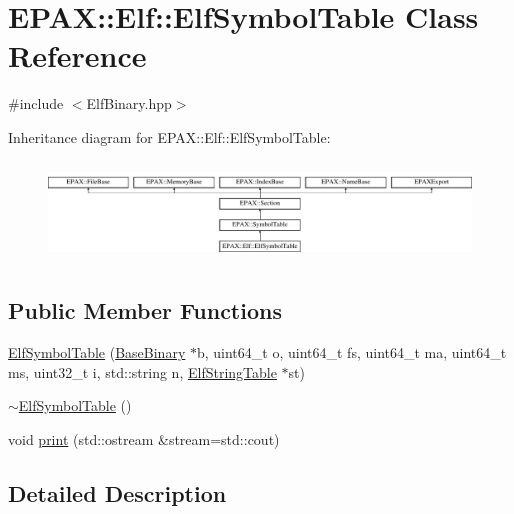\hypertarget{class_e_p_a_x_1_1_elf_1_1_elf_symbol_table}{\section{\-E\-P\-A\-X\-:\-:\-Elf\-:\-:\-Elf\-Symbol\-Table \-Class \-Reference}
\label{class_e_p_a_x_1_1_elf_1_1_elf_symbol_table}
}


{\ttfamily \#include $<$\-Elf\-Binary.\-hpp$>$}

\-Inheritance diagram for \-E\-P\-A\-X\-:\-:\-Elf\-:\-:\-Elf\-Symbol\-Table\-:\begin{figure}[H]
\begin{center}
\leavevmode
\includegraphics[height=2.666667cm]{class_e_p_a_x_1_1_elf_1_1_elf_symbol_table}
\end{center}
\end{figure}
\subsection*{\-Public \-Member \-Functions}
\begin{DoxyCompactItemize}
\item 
\hyperlink{class_e_p_a_x_1_1_elf_1_1_elf_symbol_table_a33103257dce585b4f3ace8cad4bb0d8d}{\-Elf\-Symbol\-Table} (\hyperlink{class_e_p_a_x_1_1_base_binary}{\-Base\-Binary} $\ast$b, uint64\-\_\-t o, uint64\-\_\-t fs, uint64\-\_\-t ma, uint64\-\_\-t ms, uint32\-\_\-t i, std\-::string n, \hyperlink{class_e_p_a_x_1_1_elf_1_1_elf_string_table}{\-Elf\-String\-Table} $\ast$st)
\item 
\hyperlink{class_e_p_a_x_1_1_elf_1_1_elf_symbol_table_a4442dcddc38d01ec99a4d7dd29fe9a9f}{$\sim$\-Elf\-Symbol\-Table} ()
\item 
void \hyperlink{class_e_p_a_x_1_1_elf_1_1_elf_symbol_table_af8c0bb17c3b8c38ee49142def9ee0ed0}{print} (std\-::ostream \&stream=std\-::cout)
\end{DoxyCompactItemize}


\subsection{\-Detailed \-Description}


